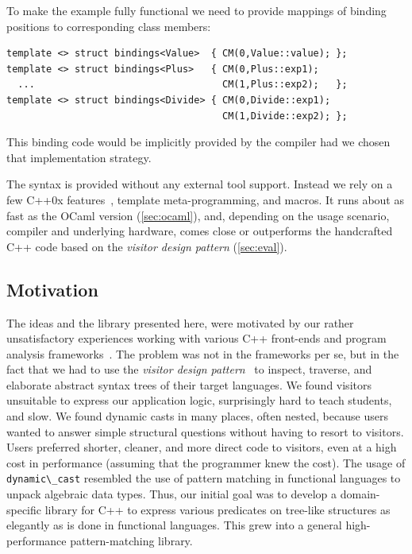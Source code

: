 \documentclass[preprint]{sigplanconf}
\makeatletter
\DeclareRobustCommand{\code}[1]{{\lstinline[breaklines=false,escapechar=@]{#1}}}
\makeatother
\begin{document}
\noindent
To make the example fully functional we need to provide mappings of binding 
positions to corresponding class members:

\begin{lstlisting}[keepspaces,columns=flexible]
template <> struct bindings<Value>  { CM(0,Value::value); };
template <> struct bindings<Plus>   { CM(0,Plus::exp1); 
  ...                                 CM(1,Plus::exp2);   };
template <> struct bindings<Divide> { CM(0,Divide::exp1); 
                                      CM(1,Divide::exp2); };
\end{lstlisting}

\noindent
This binding code would be implicitly provided by the compiler had
we chosen that implementation strategy.

The syntax is provided without any external tool support. Instead we rely on a 
few C++0x features~\cite{C++0x}, template meta-programming, and macros. It runs 
about as fast as the OCaml version (\textsection\ref{sec:ocaml}), and, depending 
on the usage scenario, compiler and underlying hardware, comes close or 
outperforms the handcrafted C++ code based on the \emph{visitor design pattern} 
(\textsection\ref{sec:eval}).

\subsection{Motivation}

The ideas and the library presented here, were motivated by our 
rather unsatisfactory experiences working with various C++ front-ends and 
program analysis frameworks~\cite{Pivot09,Phoenix,Clang,Liz}. 
The problem was not in the frameworks per se, but in the fact that we had to use
the \emph{visitor design pattern}~\cite{DesignPatterns1993} to inspect, traverse, and 
elaborate abstract syntax trees of their target languages. We found visitors 
unsuitable to express our application logic, surprisingly hard to teach 
students, and slow. We found dynamic casts in many places, often nested, 
because users wanted to answer simple structural 
questions without having to resort to visitors. Users preferred shorter, cleaner, 
and more direct code to visitors, even at a high cost in performance (assuming 
that the programmer knew the cost). The usage of \code{dynamic\_cast} resembled 
the use of pattern matching in functional languages to unpack algebraic data 
types. Thus, our initial goal was to develop a domain-specific library for C++ 
to express various predicates on tree-like structures as elegantly as is done in functional 
languages. This grew into a general high-performance pattern-matching library.
\end{document}
